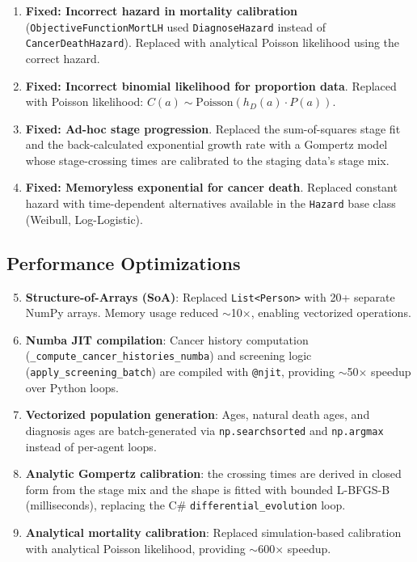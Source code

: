 \documentclass[12pt,a4paper]{article}
\begin{document}
\begin{enumerate}[nosep]
    \item \textbf{Fixed: Incorrect hazard in mortality calibration} (\texttt{ObjectiveFunctionMortLH} used \texttt{DiagnoseHazard} instead of \texttt{CancerDeathHazard}). Replaced with analytical Poisson likelihood using the correct hazard.
    \item \textbf{Fixed: Incorrect binomial likelihood for proportion data}. Replaced with Poisson likelihood: $C(a) \sim \text{Poisson}(h_D(a) \cdot P(a))$.
    \item \textbf{Fixed: Ad-hoc stage progression}. Replaced the sum-of-squares stage fit and the back-calculated exponential growth rate with a Gompertz model whose stage-crossing times are calibrated to the staging data's stage mix.
    \item \textbf{Fixed: Memoryless exponential for cancer death}. Replaced constant hazard with time-dependent alternatives available in the \texttt{Hazard} base class (Weibull, Log-Logistic).
\end{enumerate}

\subsection{Performance Optimizations}

\begin{enumerate}[nosep]
    \setcounter{enumi}{4}
    \item \textbf{Structure-of-Arrays (SoA)}: Replaced \texttt{List<Person>} with 20+ separate NumPy arrays. Memory usage reduced $\sim$10$\times$, enabling vectorized operations.
    \item \textbf{Numba JIT compilation}: Cancer history computation (\texttt{\_compute\_cancer\_histories\_numba}) and screening logic (\texttt{apply\_screening\_batch}) are compiled with \texttt{@njit}, providing $\sim$50$\times$ speedup over Python loops.
    \item \textbf{Vectorized population generation}: Ages, natural death ages, and diagnosis ages are batch-generated via \texttt{np.searchsorted} and \texttt{np.argmax} instead of per-agent loops.
    \item \textbf{Analytic Gompertz calibration}: the crossing times are derived in closed form from the stage mix and the shape is fitted with bounded L-BFGS-B (milliseconds), replacing the C\# \texttt{differential\_evolution} loop.
    \item \textbf{Analytical mortality calibration}: Replaced simulation-based calibration with analytical Poisson likelihood, providing $\sim$600$\times$ speedup.
\end{enumerate}
\end{document}
